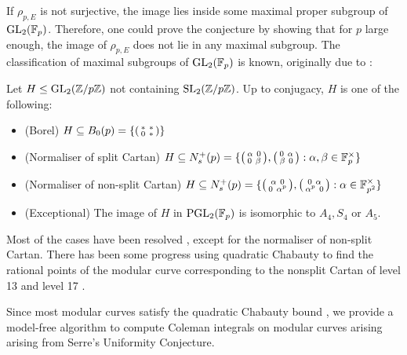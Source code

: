 If $\rho_{p,E}$ is not surjective, the image lies inside some maximal proper subgroup of $\operatorname{GL}_2(\mathbb{F}_p)$. Therefore, one could prove the conjecture by showing that for $p$ large enough, the image of $\rho_{p,E}$ does not lie in any maximal subgroup. The classification of maximal subgroups of $\operatorname{GL}_2(\mathbb{F}_p)$ is known, originally due to \cite{dickson}:

\begin{theorem}
    Let $H \leq \operatorname{GL}_2(\mathbb{Z}/p\mathbb{Z})$ not containing $\operatorname{SL}_2(\mathbb{Z}/p\mathbb{Z})$. Up to conjugacy, $H$ is one of the following:
    \begin{itemize}
        \item (Borel) $H \subseteq B_0(p) = \{ \begin{psmallmatrix} \ast \ \ast \\ 0 \ \ast \end{psmallmatrix} \}$ 
        \item (Normaliser of split Cartan) $H \subseteq N_s^+(p) = \{ \begin{psmallmatrix} \alpha \ 0 \\ 0 \ \beta \end{psmallmatrix}, \begin{psmallmatrix} 0 \ \alpha \\ \beta \ 0 \end{psmallmatrix}: \alpha,\beta \in \mathbb{F}_p^\times \}$ 
        \item (Normaliser of non-split Cartan) $H \subseteq N_s^+(p) = \{ \begin{psmallmatrix} \alpha \ 0 \\ 0 \ \alpha^p \end{psmallmatrix}, \begin{psmallmatrix} 0 \ \alpha \\ \alpha^p \ 0 \end{psmallmatrix}: \alpha \in \mathbb{F}_{p^2}^\times \}$ 
        \item (Exceptional) The image of $H$ in $\operatorname{PGL}_2(\mathbb{F}_p)$ is isomorphic to $A_4,S_4$ or $A_5$.
    \end{itemize}
\end{theorem}

Most of the cases have been resolved \cite{borel,BP1,BP2,serre72}, except for the normaliser of non-split Cartan. There has been some progress using quadratic Chabauty to find the rational points of the modular curve corresponding to the nonsplit Cartan of level 13 \cite{cursed-curve} and level 17 \cite{BDMTV}.

Since most modular curves satisfy the quadratic Chabauty bound \cite{Siksek}, we provide a model-free algorithm to compute Coleman integrals on modular curves arising  arising from Serre's Uniformity Conjecture.
